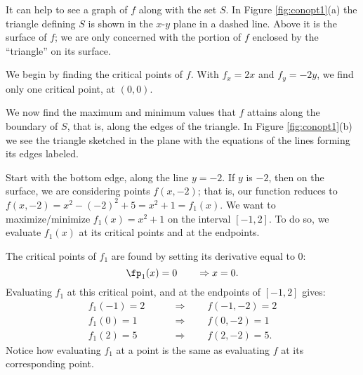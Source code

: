 {It can help to see a graph of $f$ along with the set $S$. In Figure \ref{fig:conopt1}(a) the triangle defining $S$ is shown in the $x$-$y$ plane in a dashed line. Above it is the surface of $f$; we are only concerned with the portion of $f$ enclosed by the ``triangle'' on its surface. 

We begin by finding the critical points of $f$. With $f_x = 2x$ and $f_y = -2y$, we find only one critical point, at $(0,0)$. 

We now find the maximum and minimum values that $f$ attains along the boundary of $S$, that is, along the edges of the triangle. In Figure \ref{fig:conopt1}(b) we see the triangle sketched in the plane with the equations of the lines forming its edges labeled. 

Start with the bottom edge, along the line $y=-2$. If $y$ is $-2$, then on the surface, we are considering points $f(x,-2)$; that is, our function reduces to $f(x,-2) = x^2-(-2)^2+5 = x^2+1=f_1(x)$. We want to maximize/minimize $f_1(x)=x^2+1$ on the interval $[-1,2]$. To do so, we evaluate $f_1(x)$ at its critical points and at the endpoints.
\drawexampleline

The critical points of $f_1$ are found by setting its derivative equal to 0:
$$\fp_1(x)=0\qquad \Rightarrow x=0.$$
Evaluating $f_1$ at this critical point, and at the endpoints of $[-1,2]$ gives:
\begin{align*}
f_1(-1) = 2 \qquad&\Rightarrow\qquad f(-1,-2) = 2\\
f_1(0) = 1 \qquad&\Rightarrow \qquad f(0,-2) = 1\\
f_1(2) = 5 \qquad&\Rightarrow \qquad f(2,-2) = 5.
\end{align*}
Notice how evaluating $f_1$ at a point is the same as evaluating $f$ at its corresponding point.

}
